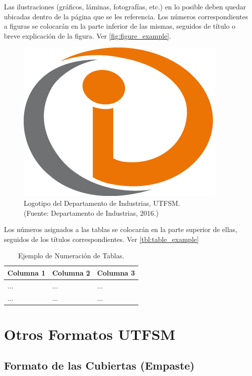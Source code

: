 \begin{description}
Las ilustraciones (gráficos, láminas, fotografías, etc.) en lo posible deben quedar ubicadas dentro de la página que se les referencia. Los números correspondientes a figuras se colocarán en la parte inferior de las mismas, seguidos de título o breve explicación de la figura. Ver \autoref{fig:figure_example}.
	\begin{figure}[ht!]
	\centering
	\includegraphics[width=.3\textwidth]{figures/logoind.png}
	
	\caption[Logotipo del Departamento de Industrias, UTFSM.]{Logotipo del Departamento de Industrias, UTFSM.\\
	{\footnotesize (Fuente: Departamento de Industrias, 2016.)}}
	
	\label{fig:figure_example}
	\end{figure}

Los números asignados a las tablas se colocarán en la parte superior de ellas, seguidos de los títulos correspondientes. Ver \autoref{tbl:table_example}

\begin{table}[ht]
\centering
\caption{Ejemplo de Numeración de Tablas.}
\begin{tabular}{p{3cm}|p{3cm}|p{3cm}}
\hline
\textbf{Columna 1} & \textbf{Columna 2} & \textbf{Columna 3} \\
\hline\hline
... & ... & ... \\
\hline
... & ... & ... \\
\hline
\end{tabular}
\label{tbl:table_example}
\end{table}

\end{description}

\section{Otros Formatos UTFSM}
\subsection{Formato de las Cubiertas (Empaste)}

